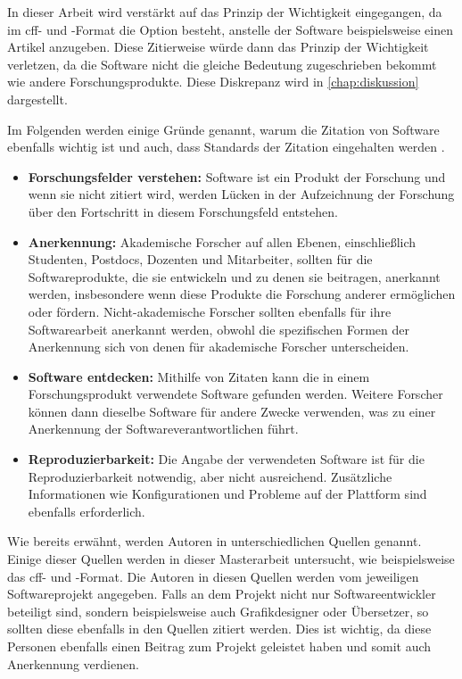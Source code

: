 In dieser Arbeit wird verstärkt auf das Prinzip der Wichtigkeit eingegangen, da im \gls{cff}- und -Format die Option besteht, anstelle der Software beispielsweise einen Artikel anzugeben.
Diese Zitierweise würde dann das Prinzip der Wichtigkeit verletzen, da die Software nicht die gleiche Bedeutung zugeschrieben bekommt wie andere Forschungsprodukte.
Diese Diskrepanz wird in \autoref{chap:diskussion} dargestellt.

Im Folgenden werden einige Gründe genannt, warum die Zitation von Software ebenfalls wichtig ist und auch, dass Standards der Zitation eingehalten werden \autocite{smith_software_2016}.

\begin{itemize}
    \item \textbf{Forschungsfelder verstehen:} Software ist ein Produkt der Forschung und wenn sie nicht zitiert wird, werden Lücken in der Aufzeichnung der Forschung über den Fortschritt in diesem Forschungsfeld entstehen.
    \item \textbf{Anerkennung:} Akademische Forscher auf allen Ebenen, einschließlich Studenten, Postdocs, Dozenten und Mitarbeiter, sollten für die Softwareprodukte, die sie entwickeln und zu denen sie beitragen, anerkannt werden, insbesondere wenn diese Produkte die Forschung anderer ermöglichen oder fördern. Nicht-akademische Forscher sollten ebenfalls für ihre Softwarearbeit anerkannt werden, obwohl die spezifischen Formen der Anerkennung sich von denen für akademische Forscher unterscheiden.
    \item \textbf{Software entdecken:} Mithilfe von Zitaten kann die in einem Forschungsprodukt verwendete Software gefunden werden. Weitere Forscher können dann dieselbe Software für andere Zwecke verwenden, was zu einer Anerkennung der Softwareverantwortlichen führt.
    \item \textbf{Reproduzierbarkeit:} Die Angabe der verwendeten Software ist für die Reproduzierbarkeit notwendig, aber nicht ausreichend. Zusätzliche Informationen wie Konfigurationen und Probleme auf der Plattform sind ebenfalls erforderlich.
\end{itemize}

Wie bereits erwähnt, werden Autoren in unterschiedlichen Quellen genannt.
Einige dieser Quellen werden in dieser Masterarbeit untersucht, wie beispielsweise das \gls{cff}- und -Format.
Die Autoren in diesen Quellen werden vom jeweiligen Softwareprojekt angegeben.
Falls an dem Projekt nicht nur Softwareentwickler beteiligt sind, sondern beispielsweise auch Grafikdesigner oder Übersetzer, so sollten diese ebenfalls in den Quellen zitiert werden.
Dies ist wichtig, da diese Personen ebenfalls einen Beitrag zum Projekt geleistet haben und somit auch Anerkennung verdienen.

